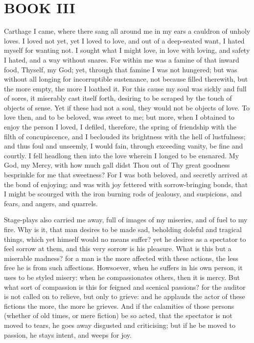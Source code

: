 \documentclass[b5paper,openright,12pt,twoside]{book}
\begin{document}
\chapter{BOOK III}


 Carthage I came, where there sang all around me in my ears a cauldron
of unholy loves. I loved not yet, yet I loved to love, and out of a
deep-seated want, I hated myself for wanting not. I sought what I might
love, in love with loving, and safety I hated, and a way without snares.
For within me was a famine of that inward food, Thyself, my God; yet,
through that famine I was not hungered; but was without all longing for
incorruptible sustenance, not because filled therewith, but the more
empty, the more I loathed it. For this cause my soul was sickly and full
of sores, it miserably cast itself forth, desiring to be scraped by the
touch of objects of sense. Yet if these had not a soul, they would not
be objects of love. To love then, and to be beloved, was sweet to
me; but more, when I obtained to enjoy the person I loved, I defiled,
therefore, the spring of friendship with the filth of concupiscence, and
I beclouded its brightness with the hell of lustfulness; and thus
foul and unseemly, I would fain, through exceeding vanity, be fine
and courtly. I fell headlong then into the love wherein I longed to be
ensnared. My God, my Mercy, with how much gall didst Thou out of Thy
great goodness besprinkle for me that sweetness? For I was both beloved,
and secretly arrived at the bond of enjoying; and was with joy fettered
with sorrow-bringing bonds, that I might be scourged with the iron
burning rods of jealousy, and suspicions, and fears, and angers, and
quarrels.

Stage-plays also carried me away, full of images of my miseries, and of
fuel to my fire. Why is it, that man desires to be made sad, beholding
doleful and tragical things, which yet himself would no means suffer?
yet he desires as a spectator to feel sorrow at them, and this very
sorrow is his pleasure. What is this but a miserable madness? for a man
is the more affected with these actions, the less free he is from such
affections. Howsoever, when he suffers in his own person, it uses to be
styled misery: when he compassionates others, then it is mercy. But what
sort of compassion is this for feigned and scenical passions? for the
auditor is not called on to relieve, but only to grieve: and he applauds
the actor of these fictions the more, the more he grieves. And if the
calamities of those persons (whether of old times, or mere fiction)
be so acted, that the spectator is not moved to tears, he goes away
disgusted and criticising; but if he be moved to passion, he stays
intent, and weeps for joy.
\end{document}

